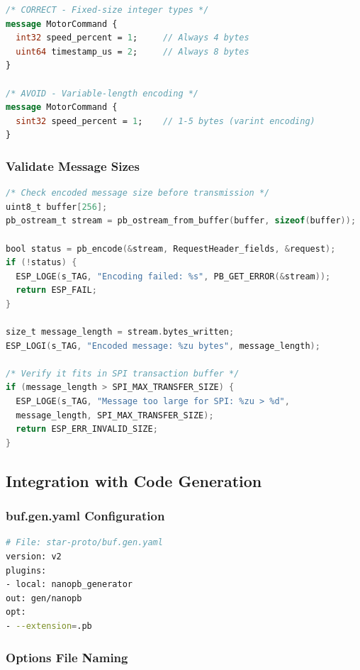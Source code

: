 \begin{lstlisting}[language=proto]
/* CORRECT - Fixed-size integer types */
message MotorCommand {
  int32 speed_percent = 1;     // Always 4 bytes
  uint64 timestamp_us = 2;     // Always 8 bytes
}

/* AVOID - Variable-length encoding */
message MotorCommand {
  sint32 speed_percent = 1;    // 1-5 bytes (varint encoding)
}


\end{lstlisting}
\subsubsection{Validate Message Sizes}

\begin{lstlisting}[language=C]
/* Check encoded message size before transmission */
uint8_t buffer[256];
pb_ostream_t stream = pb_ostream_from_buffer(buffer, sizeof(buffer));

bool status = pb_encode(&stream, RequestHeader_fields, &request);
if (!status) {
  ESP_LOGE(s_TAG, "Encoding failed: %s", PB_GET_ERROR(&stream));
  return ESP_FAIL;
}

size_t message_length = stream.bytes_written;
ESP_LOGI(s_TAG, "Encoded message: %zu bytes", message_length);

/* Verify it fits in SPI transaction buffer */
if (message_length > SPI_MAX_TRANSFER_SIZE) {
  ESP_LOGE(s_TAG, "Message too large for SPI: %zu > %d",
  message_length, SPI_MAX_TRANSFER_SIZE);
  return ESP_ERR_INVALID_SIZE;
}


\end{lstlisting}
\subsection{Integration with Code Generation}

\subsubsection{buf.gen.yaml Configuration}

\begin{lstlisting}[language=bash]
# File: star-proto/buf.gen.yaml
version: v2
plugins:
- local: nanopb_generator
out: gen/nanopb
opt:
- --extension=.pb


\end{lstlisting}
\subsubsection{Options File Naming}

